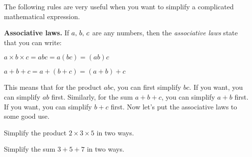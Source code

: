 \documentclass[a4paper,oneside,12pt]{article}
\begin{document}
The following rules are very useful when you want to simplify a
complicated mathematical expression.

\begin{definition}
\textbf{Associative laws.}
If ${a},\, {b},\, {c}$ are any numbers, then the
\emph{associative laws} state that you can write:
\begin{packedenumeral}
\item $a \times b \times c = abc = a (bc) = (ab) c$

\item $a + b + c = a + (b + c) = (a + b) + c$
\end{packedenumeral}
\end{definition}

This means that for the product $abc$, you can first simplify $bc$.
If you want, you can simplify $ab$ first.  Similarly, for the sum
$a + b + c$, you can simplify $a + b$ first.  If you want, you can
simplify $b + c$ first.  Now let's put the associative laws to some
good use.

\begin{exercise}
Simplify the product $2 \times 3 \times 5$ in two ways.
\end{exercise}


\begin{exercise}
Simplify the sum $3 + 5 + 7$ in two ways.
\end{exercise}

\end{document}
